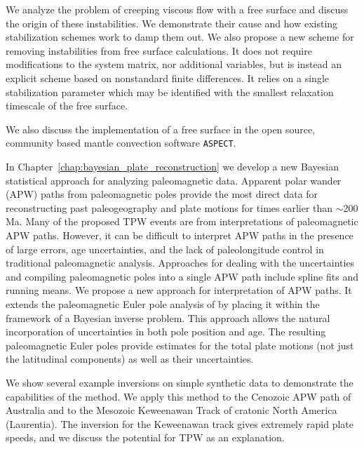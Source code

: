 We analyze the problem of creeping viscous flow with a free surface and discuss the 
origin of these instabilities. We demonstrate their cause and how existing stabilization 
schemes work to damp them out.
We also propose a new scheme for removing instabilities from free surface calculations. 
It does not require modifications to the system matrix, nor additional variables, but is instead
an explicit scheme based on nonstandard finite differences.  It relies on a single 
stabilization parameter which may be identified with the smallest relaxation timescale of the
free surface.

We also discuss the implementation of a free surface in the open source, community based
mantle convection software \texttt{ASPECT}.

In Chapter~\ref{chap:bayesian_plate_reconstruction} we develop a new Bayesian statistical approach
for analyzing paleomagnetic data.
Apparent polar wander (APW) paths from paleomagnetic poles provide the most direct data
for reconstructing past paleogeography and plate motions for times earlier than $\sim$200 Ma. 
Many of the proposed TPW events are from interpretations of paleomagnetic APW paths.
However, it can be difficult to interpret APW paths in the presence of large errors,
age uncertainties, and the lack of paleolongitude control in traditional paleomagnetic analysis.
Approaches for dealing with the uncertainties and compiling paleomagnetic poles 
into a single APW path include spline fits and running means.
We propose a new approach for interpretation of APW paths.
It extends the paleomagnetic Euler pole analysis of \citet{gordon1984paleomagnetic}
by placing it within the framework of a Bayesian inverse problem.
This approach allows the natural incorporation of uncertainties in both pole position and age.
The resulting paleomagnetic Euler poles provide estimates for the total
plate motions (not just the latitudinal components) as well as their uncertainties.

We show several example inversions on simple synthetic data to demonstrate the capabilities of the method.
We apply this method to the Cenozoic APW path of Australia and to the
Mesozoic Keweenawan Track of cratonic North America (Laurentia).
The inversion for the Keweenawan track gives extremely rapid plate speeds, and we discuss the potential for TPW as an explanation.

\nocite{newton1728principia}
